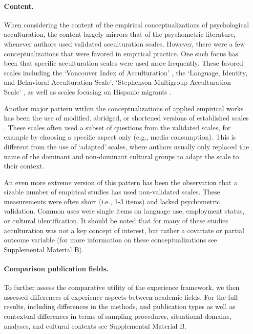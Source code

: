 \color{blue}
\paragraph{Content.}

When considering the content of the empirical conceptualizations of
psychological acculturation, the content largely mirrors that of the
psychometric literature, whenever authors used validated acculturation
scales. However, there were a few conceptualizations that were favored
in empirical practice. One such focus has been that specific
acculturation scales were used more frequently. These favored scales
including the `Vancouver Index of Acculturation' \citep[][]{Ryder2000},
the `Language, Identity, and Behavioral Acculturation Scale',
`Stephenson Multigroup Acculturation Scale' \citep[][]{Stephenson2000},
as well as scales focusing on Hispanic migrants
\citep[][]{Cuellar1995a, Marin1987, Marin1987}.

Another major pattern within the conceptualizations of applied empirical
works has been the use of modified, abridged, or shortened versions of
established scales \citep[e.g.,][]{Green2014,Im2009}. These scales often
used a subset of questions from the validated scales, for example by
choosing a specific aspect only (e.g., media consumption). This is
different from the use of `adapted' scales, where authors usually only
replaced the name of the dominant and non-dominant cultural groups to
adapt the scale to their context.

An even more extreme version of this pattern has been the observation
that a sizable number of empirical studies has used non-validated
scales. These measurements were often short (i.e., 1-3 items) and lacked
psychometric validation. Common uses were single items on language use,
employment status, or cultural identification. It should be noted that
for many of these studies acculturation was not a key concept of
interest, but rather a covariate or partial outcome variable (for more
information on these conceptualizations see Supplemental Material B).
\color{black}

\paragraph{Comparison publication fields.}

To further assess the comparative utility of the experience framework,
we then assessed differences of experience aspects between academic
fields. For the full results, including differences in the methods, and
publication types as well as contextual differences in terms of sampling
procedures, situational domains, analyses, and cultural contexts see
Supplemental Material B.

